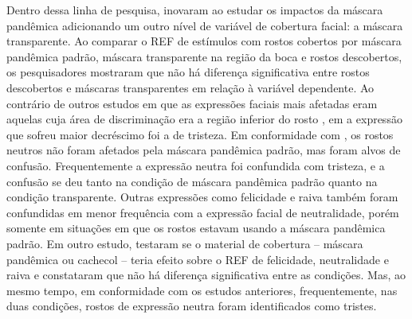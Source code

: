 \documentclass[portuguese]{textolivre}
\begin{document}
Dentro dessa linha de pesquisa, \textcite{marini_impact_2021} inovaram ao estudar os impactos da máscara pandêmica adicionando um outro nível de variável de cobertura facial: a máscara transparente. Ao comparar o REF de estímulos com rostos cobertos por máscara pandêmica padrão, máscara transparente na região da boca e rostos descobertos, os pesquisadores mostraram que não há diferença significativa entre rostos descobertos e máscaras transparentes em relação à variável dependente. Ao contrário de outros estudos em que as expressões faciais mais afetadas eram aquelas cuja área de discriminação era a região inferior do rosto \cite{bani_behind_2021, carbon_wearing_2020}, em \textcite{marini_impact_2021} a expressão que sofreu maior decréscimo foi a de tristeza. Em conformidade com \textcite{carbon_wearing_2020}, os rostos neutros não foram afetados pela máscara pandêmica padrão, mas foram alvos de confusão. Frequentemente a expressão neutra foi confundida com tristeza, e a confusão se deu tanto na condição de máscara pandêmica padrão quanto na condição transparente. Outras expressões como felicidade e raiva também foram confundidas em menor frequência com a expressão facial de neutralidade, porém somente em situações em que os rostos estavam usando a máscara pandêmica padrão. Em outro estudo, \textcite{calbi_consequences_2021} testaram se o material de cobertura – máscara pandêmica ou cachecol – teria efeito sobre o REF de felicidade, neutralidade e raiva e constataram que não há diferença significativa entre as condições. Mas, ao mesmo tempo, em conformidade com os estudos anteriores, frequentemente, nas duas condições, rostos de expressão neutra foram identificados como tristes.
\end{document}
